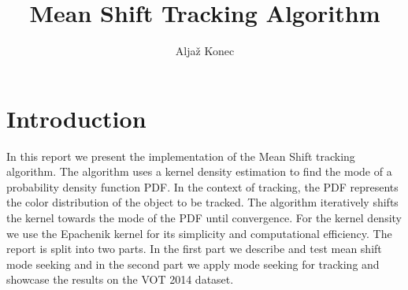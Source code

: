 \documentclass[9pt]{IEEEtran}
\title{\vspace{0ex} Mean Shift Tracking Algorithm}
\author{Aljaž Konec\vspace{-4.0ex}}
\begin{document}
\maketitle

\section{Introduction}
In this report we present the implementation of the Mean Shift tracking algorithm. 
The algorithm uses a kernel density estimation to find the mode of a probability density function PDF.
In the context of tracking, the PDF represents the color distribution of the object to be tracked.
The algorithm iteratively shifts the kernel towards the mode of the PDF until convergence.
For the kernel density we use the Epachenik kernel for its simplicity and computational efficiency.
The report is split into two parts.
In the first part we describe and test mean shift mode seeking and in the second part we apply mode seeking for tracking and showcase the results on the VOT 2014 dataset.
\end{document}

